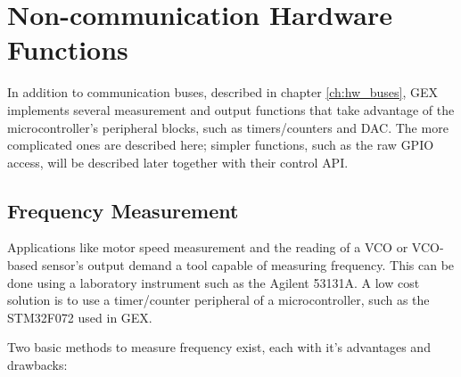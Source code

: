 \chapter{Non-communication Hardware Functions}

In addition to communication buses, described in chapter \ref{ch:hw_buses}, GEX implements several measurement and output functions that take advantage of the microcontroller's peripheral blocks, such as timers/counters and \gls{DAC}. The more complicated ones are described here; simpler functions, such as the raw \gls{GPIO} access, will be described later together with their control \gls{API}.

\section{Frequency Measurement} \label{sec:theory-fcap}

Applications like motor speed measurement and the reading of a \gls{VCO} or \gls{VCO}-based sensor's output demand a tool capable of measuring frequency. This can be done using a laboratory instrument such as the Agilent 53131A. A low cost solution is to use a timer/counter peripheral of a microcontroller, such as the STM32F072 used in GEX.

Two basic methods to measure frequency exist, each with it's advantages and drawbacks:

